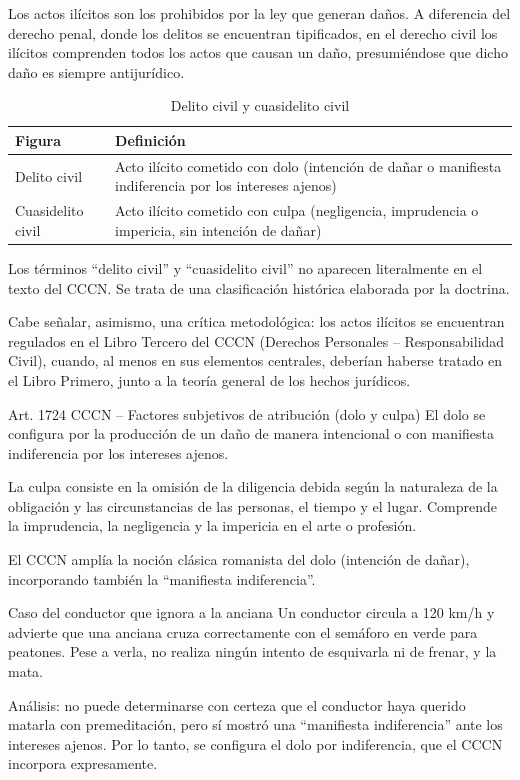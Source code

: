 \documentclass[12pt,oneside]{book}
\begin{document}
Los actos ilícitos son los prohibidos por la ley que generan daños. A diferencia del derecho penal, donde los delitos se encuentran tipificados, en el derecho civil los ilícitos comprenden todos los actos que causan un daño, presumiéndose que dicho daño es siempre antijurídico.

\begin{table}[H]
\centering
\caption{Delito civil y cuasidelito civil}
\begin{tabularx}{\textwidth}{l X}
\toprule
\textbf{Figura} & \textbf{Definición} \\
\midrule
Delito civil & Acto ilícito cometido con dolo (intención de dañar o manifiesta indiferencia por los intereses ajenos) \\
Cuasidelito civil & Acto ilícito cometido con culpa (negligencia, imprudencia o impericia, sin intención de dañar) \\
\bottomrule
\end{tabularx}
\end{table}

\begin{note}
Los términos ``delito civil'' y ``cuasidelito civil'' no aparecen literalmente en el texto del CCCN. Se trata de una clasificación histórica elaborada por la doctrina.

Cabe señalar, asimismo, una crítica metodológica: los actos ilícitos se encuentran regulados en el Libro Tercero del CCCN (Derechos Personales -- Responsabilidad Civil), cuando, al menos en sus elementos centrales, deberían haberse tratado en el Libro Primero, junto a la teoría general de los hechos jurídicos.
\end{note}

\begin{definition}{Art. 1724 CCCN -- Factores subjetivos de atribución (dolo y culpa)}
El dolo se configura por la producción de un daño de manera intencional o con manifiesta indiferencia por los intereses ajenos.

La culpa consiste en la omisión de la diligencia debida según la naturaleza de la obligación y las circunstancias de las personas, el tiempo y el lugar. Comprende la imprudencia, la negligencia y la impericia en el arte o profesión.
\end{definition}

El CCCN amplía la noción clásica romanista del dolo (intención de dañar), incorporando también la ``manifiesta indiferencia''.

\begin{example}{Caso del conductor que ignora a la anciana}
Un conductor circula a 120 km/h y advierte que una anciana cruza correctamente con el semáforo en verde para peatones. Pese a verla, no realiza ningún intento de esquivarla ni de frenar, y la mata.

Análisis: no puede determinarse con certeza que el conductor haya querido matarla con premeditación, pero sí mostró una ``manifiesta indiferencia'' ante los intereses ajenos. Por lo tanto, se configura el dolo por indiferencia, que el CCCN incorpora expresamente.
\end{example}
\end{document}

